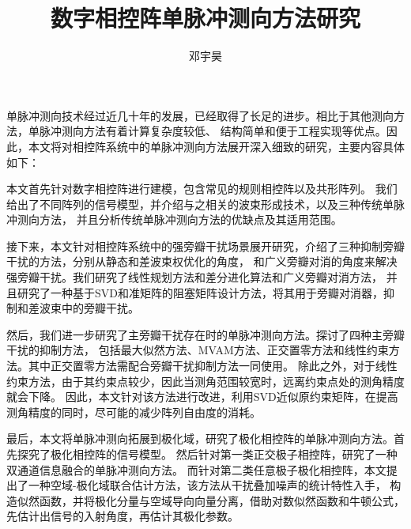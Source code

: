 \documentclass[master]{thesis-uestc}
\title{数字相控阵单脉冲测向方法研究}{The Research on Monopulse estimation with 
Digital Phased Array}
\author{邓宇昊}{Yuhao Deng}
\begin{document}
\makecover
\originalitydeclaration

\begin{chineseabstract}
单脉冲测向技术经过近几十年的发展，已经取得了长足的进步。相比于其他测向方法，单脉冲测向方法有着计算复杂度较低、
结构简单和便于工程实现等优点。因此，本文将对相控阵系统中的单脉冲测向方法展开深入细致的研究，主要内容具体如下：

本文首先针对数字相控阵进行建模，包含常见的规则相控阵以及共形阵列。
我们给出了不同阵列的信号模型，并介绍与之相关的波束形成技术，以及三种传统单脉冲测向方法，
并且分析传统单脉冲测向方法的优缺点及其适用范围。

接下来，本文针对相控阵系统中的强旁瓣干扰场景展开研究，介绍了三种抑制旁瓣干扰的方法，分别从静态和差波束权优化的角度，
和广义旁瓣对消的角度来解决强旁瓣干扰。我们研究了线性规划方法和差分进化算法和广义旁瓣对消方法，
并且研究了一种基于SVD和准矩阵的阻塞矩阵设计方法，将其用于旁瓣对消器，抑制和差波束中的旁瓣干扰。

然后，我们进一步研究了主旁瓣干扰存在时的单脉冲测向方法。探讨了四种主旁瓣干扰的抑制方法，
包括最大似然方法、MVAM方法、正交置零方法和线性约束方法。其中正交置零方法需配合旁瓣干扰抑制方法一同使用。
除此之外，对于线性约束方法，由于其约束点较少，因此当测角范围较宽时，远离约束点处的测角精度就会下降。
因此，本文针对该方法进行改进，利用SVD近似原约束矩阵，在提高测角精度的同时，尽可能的减少阵列自由度的消耗。

最后，本文将单脉冲测向拓展到极化域，研究了极化相控阵的单脉冲测向方法。首先探究了极化相控阵的信号模型。
然后针对第一类正交极子相控阵，研究了一种双通道信息融合的单脉冲测向方法。
而针对第二类任意极子极化相控阵，本文提出了一种空域-极化域联合估计方法，该方法从干扰叠加噪声的统计特性入手，
构造似然函数，并将极化分量与空域导向向量分离，借助对数似然函数和牛顿公式，先估计出信号的入射角度，再估计其极化参数。

\end{chineseabstract}
\end{document}
